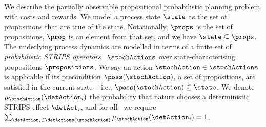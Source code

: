 

We describe the partially observable propositional probabilistic
planning problem, with costs and rewards. We model a process state
$\state$ as the set of propositions that are true of the
state. Notationally, $\props$ is the set of propositions, $\prop$ is
an element from that set, and we have $\state \subseteq
\props$. The underlying process
dynamics are modelled in terms of a finite set of {\em probabilistic
STRIPS operators}~\cite{boutilier:abstraction} $\stochActions$ over
state-characterising propositions $\propositions$.
We say an action $\stochAction \in \stochActions$ is
applicable if its precondition $\poss(\stochAction)$, a set of
propositions, are satisfied in the current state -- i.e., $\poss(\stochAction) \subseteq
\state$. We denote $\mu_{\stochAction}(\detAction_i)$ the probability that
nature chooses a deterministic STRIPS effect $\detAct_i$, and for
all \stochAction\ we require
$\sum_{\detAction_i \in \detActions(\stochAction)}
\mu_{\stochAction}(\detAction_i) = 1$.


